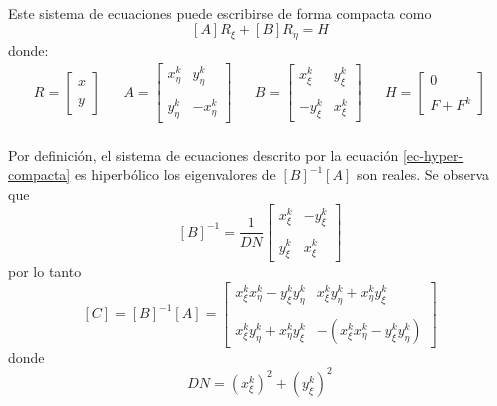 \documentclass[letterpaper, openright, 12pt]{book}
\begin{document}
	\paragraph*{}
		Este sistema de ecuaciones puede escribirse de forma compacta como
		\begin{equation}
			\left[A \right] R_{\xi} + \left[ B \right] R_{\eta} = H
			\label{ec-hyper-compacta}
		\end{equation}
		donde:
		\begin{align*}
			R = \begin{bmatrix}
		 x \\ \\
		 y
			\end{bmatrix}&&
			A = \begin{bmatrix}
				x_{\eta}^{k} & y_{\eta}^{k} \\ \\
				y_{\eta}^{k} & -x_{\eta}^{k}
			\end{bmatrix}&&
			B = \begin{bmatrix}
				x_{\xi}^{k} & y_{\xi}^{k} \\ \\
				-y_{\xi}^{k} & x_{\xi}^{k}
			\end{bmatrix}&&
			H = \begin{bmatrix}
				0 \\ \\
				F + F^{k}
			\end{bmatrix}
		\end{align*}
		
	\paragraph*{}
		Por definición, el sistema de ecuaciones descrito por la ecuación \ref{ec-hyper-compacta} es hiperbólico los eigenvalores de $\left[ B \right]^{-1} \left[ A \right]$ son reales. Se observa que\\
		\begin{equation*}
			\left[ B \right]^{-1} = \frac{1}{DN}\begin{bmatrix}
				x_{\xi}^{k} & -y_{\xi}^{k} \\ \\
				y_{\xi}^{k} & x_{\xi}^{k}
			\end{bmatrix}
		\end{equation*}
		por lo tanto
		\begin{equation*}
			\left[ C \right] = \left[ B \right]^{-1} \left[ A \right] = \begin{bmatrix}
				x_{\xi}^{k} x_{\eta}^{k} - y_{\xi}^{k} y_{\eta}^{k} &
				x_{\xi}^{k} y_{\eta}^{k} + x_{\eta}^{k} y_{\xi}^{k} \\ \\
				x_{\xi}^{k} y_{\eta}^{k} + x_{\eta}^{k} y_{\xi}^{k} &
				- \left( x_{\xi}^{k} x_{\eta}^{k} - y_{\xi}^{k} y_{\eta}^{k} \right)
			\end{bmatrix}
		\end{equation*}
		donde
		\begin{equation*}
			DN = \left( x_{\xi}^{k} \right)^2 + \left( y_{\xi}^{k} \right)^2
		\end{equation*}
	
\end{document}
